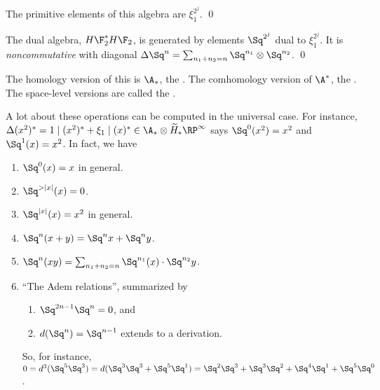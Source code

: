\begin{corollary}
The primitive elements of this algebra are $\xi_1^{2^j}$. \qed
\end{corollary}

\begin{corollary}
The dual algebra, $H\F_2^* H\F_2$, is generated by elements $\Sq^{2^j}$ dual to $\xi_1^{2^j}$.  It is \emph{noncommutative} with diagonal $\Delta \Sq^n = \sum_{n_1 + n_2 = n} \Sq^{n_1} \otimes \Sq^{n_2}$. \qed
\end{corollary}

The homology version of this is $\A_*$, the .  The comhomology version of $\A^*$, the .  The space-level versions are called the .

A lot about these operations can be computed in the universal case.  For instance, $\Delta(x^2)^* = 1 \mid (x^2)^* + \xi_1 \mid (x)^* \in \A_* \otimes \widetilde H_* \RP^\infty$ says $\Sq^0(x^2) = x^2$ and $\Sq^1(x) = x^2$.  In fact, we have
\begin{enumerate}
    \item $\Sq^0(x) = x$ in general.
    \item $\Sq^{>|x|}(x) = 0$.
    \item $\Sq^{|x|}(x) = x^2$ in general.
    \item $\Sq^n(x+y) = \Sq^n x + \Sq^n y$.
    \item $\Sq^n(xy) = \sum_{n_1 + n_2 = n} \Sq^{n_1}(x) \cdot \Sq^{n_2} y$.
    \item ``The Adem relations'', summarized by
    \begin{enumerate}
        \item $\Sq^{2n-1} \Sq^n = 0$, and
        \item $d(\Sq^n) = \Sq^{n-1}$ extends to a derivation.
    \end{enumerate}
    So, for instance, $0 = d^3(\Sq^5 \Sq^3) = d(\Sq^3\Sq^3 + \Sq^5 \Sq^1) = \Sq^2 \Sq^3 + \Sq^3 \Sq^2 + \Sq^4 \Sq^1 + \Sq^5 \Sq^0$.
\end{enumerate}

